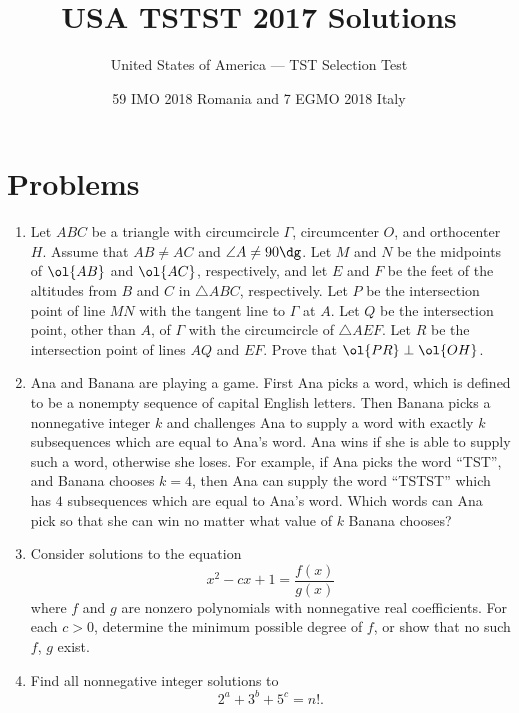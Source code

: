 \documentclass[11pt]{scrartcl}
\begin{document}
\title{USA TSTST 2017 Solutions}
\subtitle{United States of America --- TST Selection Test}
\date{59 IMO 2018 Romania and 7 EGMO 2018 Italy}

\maketitle

\tableofcontents
\newpage

\addtocounter{section}{-1}
\section{Problems}
\begin{enumerate}[\bfseries 1.]
\item %
Let $ABC$ be a triangle with circumcircle $\Gamma$,
circumcenter $O$, and orthocenter $H$.
Assume that $AB \neq AC$ and $\angle A \neq 90\dg$.
Let $M$ and $N$ be the midpoints of $\ol{AB}$ and $\ol{AC}$,
respectively, and let $E$ and $F$ be the feet of the altitudes
from $B$ and $C$ in $\triangle ABC$, respectively.
Let $P$ be the intersection point of line $MN$
with the tangent line to $\Gamma$ at $A$.
Let $Q$ be the intersection point,
other than $A$, of $\Gamma$ with the circumcircle of $\triangle AEF$.
Let $R$ be the intersection point of lines $AQ$ and $EF$.
Prove that $\ol{PR} \perp \ol{OH}$.

\item %
Ana and Banana are playing a game. First Ana picks a word,
which is defined to be a nonempty sequence of capital English letters.
Then Banana picks a nonnegative integer $k$ and challenges Ana
to supply a word with exactly $k$ subsequences which are equal to Ana's word.
Ana wins if she is able to supply such a word, otherwise she loses.
For example, if Ana picks the word ``TST'', and Banana chooses $k = 4$,
then Ana can supply the word ``TSTST'' which has $4$ subsequences
which are equal to Ana's word.
Which words can Ana pick so that she can win no matter what value of
$k$ Banana chooses?

\item %
Consider solutions to the equation
\[ x^2 - cx + 1 = \frac{f(x)}{g(x)} \]
where $f$ and $g$ are nonzero polynomials with nonnegative real coefficients.
For each $c > 0$, determine the minimum possible degree of $f$, or show
that no such $f$, $g$ exist.

\item %
Find all nonnegative integer solutions to \[ 2^a + 3^b + 5^c = n!. \]


\end{enumerate}
\end{document}
